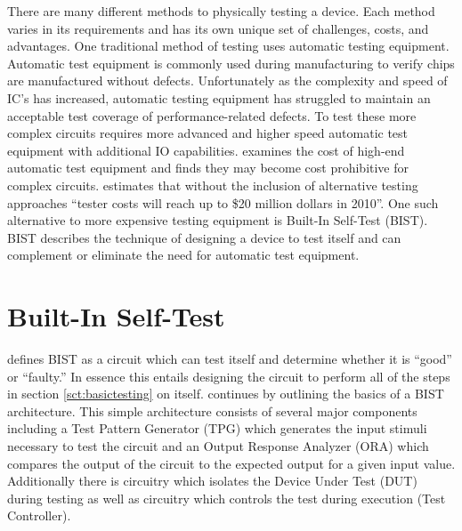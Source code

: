 \documentclass[12pt]{report}
\begin{document}
There are many different methods to physically testing a device.  Each method varies in its requirements and has its own unique set of challenges, costs, and advantages.  One traditional method of testing uses automatic testing equipment.  Automatic test equipment is commonly used during manufacturing to verify chips are manufactured without defects\cite{zorian}.  Unfortunately as the complexity and speed of IC's has increased, automatic testing equipment has struggled to maintain an acceptable test coverage of performance-related defects\cite{zorian}.  To test these more complex circuits requires more advanced and higher speed automatic test equipment with additional IO capabilities\cite{zorian}.  \cite{zorian} examines the cost of high-end automatic test equipment and finds they may become cost prohibitive for complex circuits.  \cite{itrs} estimates that without the inclusion of alternative testing approaches ``tester costs will reach up to \$20 million dollars in 2010''. One such alternative to more expensive testing equipment is Built-In Self-Test (BIST). BIST describes the technique of designing a device to test itself\cite{stroud} and can complement or eliminate the need for automatic test equipment\cite{zorian}.

\section{Built-In Self-Test}
\cite{stroud} defines BIST as a circuit which can test itself and determine whether it is ``good'' or ``faulty.''  In essence this entails designing the circuit to perform all of the steps in section \ref{sct:basictesting} on itself.  \cite{stroud} continues by outlining the basics of a BIST architecture.  This simple architecture consists of several major components including a Test Pattern Generator (TPG) which generates the input stimuli necessary to test the circuit and an Output Response Analyzer (ORA) which compares the output of the circuit to the expected output for a given input value.  Additionally there is circuitry which isolates the Device Under Test (DUT) during testing as well as circuitry which controls the test during execution (Test Controller)\cite{stroud}.
\end{document}
